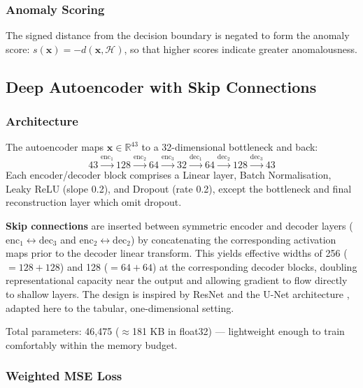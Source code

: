 \documentclass[conference]{IEEEtran}
\begin{document}
\subsubsection{Anomaly Scoring}

The signed distance from the decision boundary is negated to form the anomaly
score: $s(\mathbf{x}) = -d(\mathbf{x},\mathcal{H})$, so that higher scores
indicate greater anomalousness.

\subsection{Deep Autoencoder with Skip Connections}

\subsubsection{Architecture}

The autoencoder maps $\mathbf{x}\in\mathbb{R}^{43}$ to a 32-dimensional bottleneck
and back:
\begin{equation}
  43 \xrightarrow{\text{enc}_1} 128
     \xrightarrow{\text{enc}_2}  64
     \xrightarrow{\text{enc}_3}  32
     \xrightarrow{\text{dec}_1}  64
     \xrightarrow{\text{dec}_2} 128
     \xrightarrow{\text{dec}_3}  43
\end{equation}
Each encoder/decoder block comprises a Linear layer, Batch Normalisation,
Leaky ReLU (slope 0.2), and Dropout (rate 0.2), except the bottleneck and
final reconstruction layer which omit dropout.

\textbf{Skip connections} are inserted between symmetric encoder and decoder
layers ($\text{enc}_1 \leftrightarrow \text{dec}_3$ and
$\text{enc}_2 \leftrightarrow \text{dec}_2$) by concatenating the corresponding
activation maps prior to the decoder linear transform. This yields effective
widths of 256 ($=128+128$) and 128 ($=64+64$) at the corresponding decoder
blocks, doubling representational capacity near the output and allowing
gradient to flow directly to shallow layers. The design is inspired by
ResNet \cite{he2016deep} and the U-Net architecture \cite{ronneberger2015u},
adapted here to the tabular, one-dimensional setting.

Total parameters: 46{,}475 ($\approx$181 KB in float32) — lightweight enough
to train comfortably within the memory budget.

\subsubsection{Weighted MSE Loss}
\end{document}
